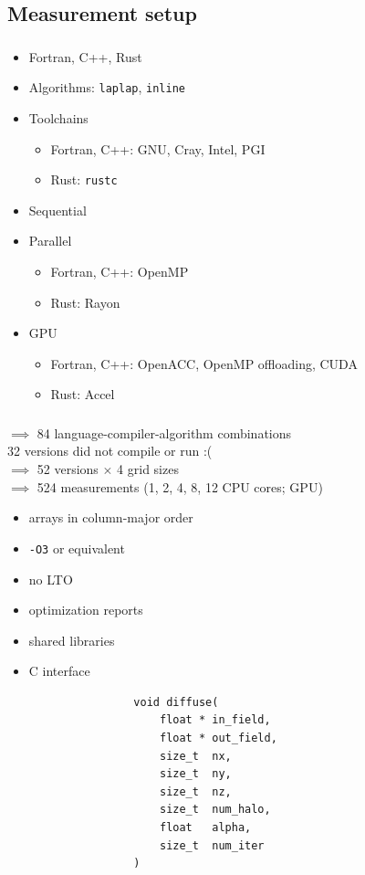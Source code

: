 \documentclass[aspectratio=43, t]{beamer}
\begin{document}
\subsection*{Measurement setup}
\begin{frame}
	\frametitle{\subsecname}
	\begin{itemize}
		\item Fortran, C++, Rust
		\item Algorithms: \texttt{laplap}, \texttt{inline}
		\item Toolchains
			\begin{itemize}
				\item Fortran, C++: GNU, Cray, Intel, PGI
				\item Rust: \texttt{rustc}
			\end{itemize}
		\item Sequential
		\item Parallel
			\begin{itemize}
				\item Fortran, C++: OpenMP
				\item Rust: Rayon
			\end{itemize}
		\item GPU
			\begin{itemize}
				\item Fortran, C++: OpenACC, OpenMP offloading, CUDA
				\item Rust: Accel
			\end{itemize}
	\end{itemize}
\end{frame}

\begin{frame}
	\frametitle{\subsecname}
	$\implies$ 84 language-compiler-algorithm combinations \\[\baselineskip]
	32 versions did not compile or run :( \\[\baselineskip]
	$\implies$ 52 versions $\times$ 4 grid sizes \\[\baselineskip]
	$\implies$ 524 measurements (1, 2, 4, 8, 12 CPU cores; GPU)
\end{frame}

\begin{frame}[fragile]
	\begin{itemize}
		\item arrays in column-major order
		\item \texttt{-O3} or equivalent
		\item no LTO
		\item optimization reports
		\item shared libraries
		\item C interface \\
			\begin{verbatim}
				void diffuse(
					float * in_field,
					float * out_field,
					size_t  nx,
					size_t  ny,
					size_t  nz,
					size_t  num_halo,
					float   alpha,
					size_t  num_iter
				)
			\end{verbatim}
	\end{itemize}

\end{frame}
\end{document}
